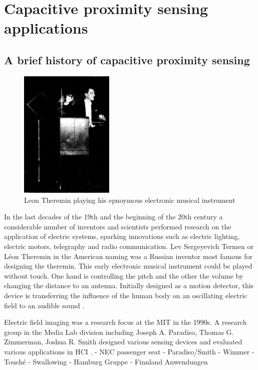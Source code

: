 \section{Capacitive proximity sensing applications}
\subsection{A brief history of capacitive proximity sensing}
\begin{figure}[h]
\centering
\includegraphics[width=0.4\textwidth]{images/leon_theremin.jpg}
\caption{Leon Theremin playing his epnoymous electronic musical instrument \cite{Glinsky2000}}
\label{fig:leon_theremin}
\end{figure}
In the last decades of the 19th and the beginning of the 20th century a considerable number of inventors and scientists performed research on the application of electric systems, sparking innovations such as electric lighting, electric motors, telegraphy and radio communication. Lev Sergeyevich Termen or Léon Theremin in the American naming was a Russian inventor most famous for designing the theremin. This early electronic musical instrument could be played without touch. One hand is controlling the pitch and the other the volume by changing the distance to an antenna. Initially designed as a motion detector, this device is transferring the influence of the human body on an oscillating electric field to an audible sound \cite{Glinsky2000}. 

Electric field imaging was a research focus at the MIT in the 1990s. A research group in the Media Lab division including Joseph A. Paradiso, Thomas G. Zimmerman, Joshua R. Smith designed various sensing devices and evaluated various applications in HCI \cite{Zimmerman1995}\cite{Smith1999a}.
- NEC passenger seat
- Paradiso/Smith
- Wimmer
- Touché
- Swallowing
- Hamburg Gruppe
- Finnland Anwendungen
